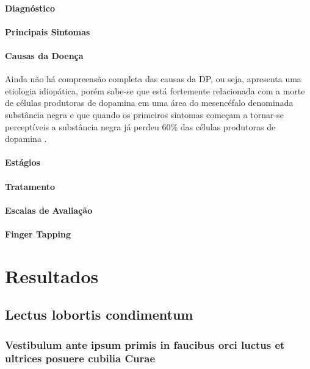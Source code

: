 \documentclass[
	12pt,				%
	openany,			%
	oneside,			%
	a4paper,			%
	english,			%
	french,				%
	spanish,			%
	brazil				%
	]{abntex2}
\begin{document}
\subsection{Diagnóstico}
\subsection{Principais Sintomas}
\subsection{Causas da Doença}

Ainda não há compreensão completa das causas da DP, ou seja, apresenta uma etiologia idiopática, porém sabe-se que está fortemente relacionada com a morte de células produtoras de dopamina em uma área do mesencéfalo denominada substância negra e que quando os primeiros sintomas começam a tornar-se perceptíveis a substância negra já perdeu 60\% das células produtoras de dopamina \cite{moreira2007}
.
\subsection{Estágios}
\subsection{Tratamento}
\subsection{Escalas de Avaliação}

\subsection{Finger Tapping}

\part{Resultados}

\chapter{Lectus lobortis condimentum}

\section{Vestibulum ante ipsum primis in faucibus orci luctus et ultrices
posuere cubilia Curae}
\end{document}
